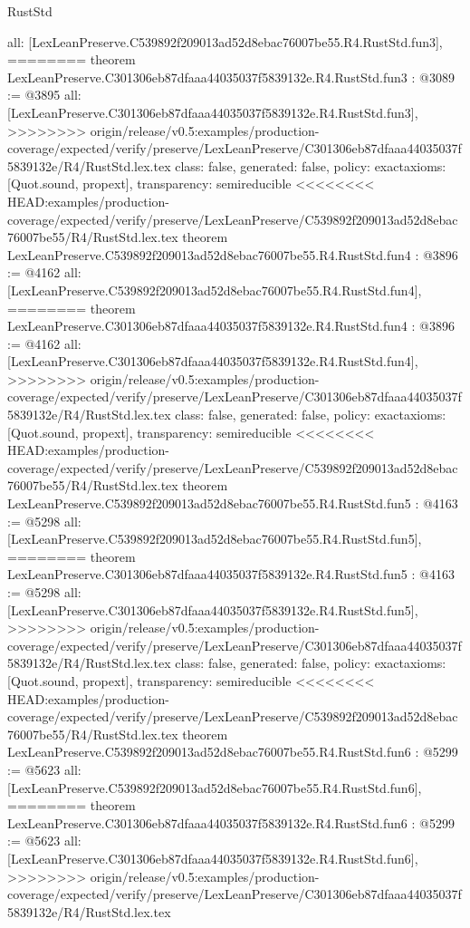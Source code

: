 \begin{lexlean}{RustStd}
\begin{coremodule}
{\begin{coremodule}
{{{{{{  all: [LexLeanPreserve.C539892f209013ad52d8ebac76007be55.R4.RustStd.fun3],
========
theorem LexLeanPreserve.C301306eb87dfaaa44035037f5839132e.R4.RustStd.fun3 : @3089 := @3895 {
  all: [LexLeanPreserve.C301306eb87dfaaa44035037f5839132e.R4.RustStd.fun3],
>>>>>>>> origin/release/v0.5:examples/production-coverage/expected/verify/preserve/LexLeanPreserve/C301306eb87dfaaa44035037f5839132e/R4/RustStd.lex.tex
  class: false,
  generated: false,
  policy: exact{axioms: [Quot.sound, propext]},
  transparency: semireducible
}
<<<<<<<< HEAD:examples/production-coverage/expected/verify/preserve/LexLeanPreserve/C539892f209013ad52d8ebac76007be55/R4/RustStd.lex.tex
theorem LexLeanPreserve.C539892f209013ad52d8ebac76007be55.R4.RustStd.fun4 : @3896 := @4162 {
  all: [LexLeanPreserve.C539892f209013ad52d8ebac76007be55.R4.RustStd.fun4],
========
theorem LexLeanPreserve.C301306eb87dfaaa44035037f5839132e.R4.RustStd.fun4 : @3896 := @4162 {
  all: [LexLeanPreserve.C301306eb87dfaaa44035037f5839132e.R4.RustStd.fun4],
>>>>>>>> origin/release/v0.5:examples/production-coverage/expected/verify/preserve/LexLeanPreserve/C301306eb87dfaaa44035037f5839132e/R4/RustStd.lex.tex
  class: false,
  generated: false,
  policy: exact{axioms: [Quot.sound, propext]},
  transparency: semireducible
}
<<<<<<<< HEAD:examples/production-coverage/expected/verify/preserve/LexLeanPreserve/C539892f209013ad52d8ebac76007be55/R4/RustStd.lex.tex
theorem LexLeanPreserve.C539892f209013ad52d8ebac76007be55.R4.RustStd.fun5 : @4163 := @5298 {
  all: [LexLeanPreserve.C539892f209013ad52d8ebac76007be55.R4.RustStd.fun5],
========
theorem LexLeanPreserve.C301306eb87dfaaa44035037f5839132e.R4.RustStd.fun5 : @4163 := @5298 {
  all: [LexLeanPreserve.C301306eb87dfaaa44035037f5839132e.R4.RustStd.fun5],
>>>>>>>> origin/release/v0.5:examples/production-coverage/expected/verify/preserve/LexLeanPreserve/C301306eb87dfaaa44035037f5839132e/R4/RustStd.lex.tex
  class: false,
  generated: false,
  policy: exact{axioms: [Quot.sound, propext]},
  transparency: semireducible
}
<<<<<<<< HEAD:examples/production-coverage/expected/verify/preserve/LexLeanPreserve/C539892f209013ad52d8ebac76007be55/R4/RustStd.lex.tex
theorem LexLeanPreserve.C539892f209013ad52d8ebac76007be55.R4.RustStd.fun6 : @5299 := @5623 {
  all: [LexLeanPreserve.C539892f209013ad52d8ebac76007be55.R4.RustStd.fun6],
========
theorem LexLeanPreserve.C301306eb87dfaaa44035037f5839132e.R4.RustStd.fun6 : @5299 := @5623 {
  all: [LexLeanPreserve.C301306eb87dfaaa44035037f5839132e.R4.RustStd.fun6],
>>>>>>>> origin/release/v0.5:examples/production-coverage/expected/verify/preserve/LexLeanPreserve/C301306eb87dfaaa44035037f5839132e/R4/RustStd.lex.tex
}}}}}}}}}}
\end{coremodule}}
\end{coremodule}
\end{lexlean}
